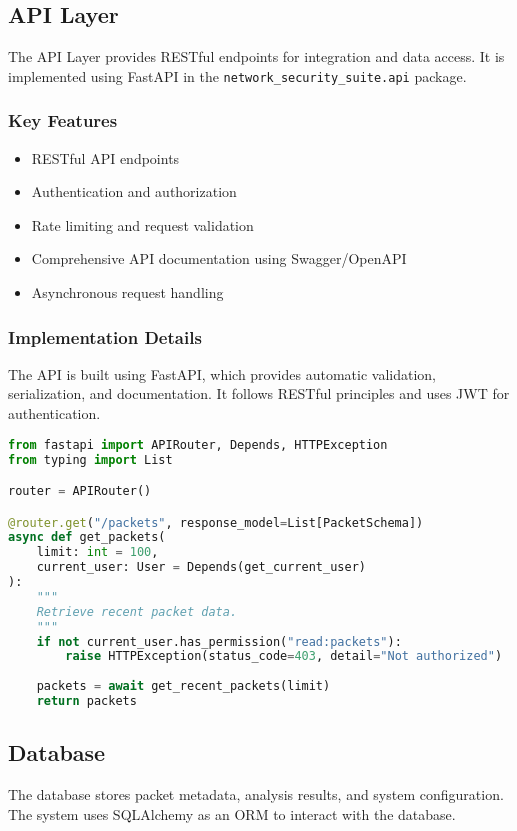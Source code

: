 \subsection{API Layer}
The API Layer provides RESTful endpoints for integration and data access. It is implemented using FastAPI in the \texttt{network\_security\_suite.api} package.

\subsubsection{Key Features}
\begin{itemize}
    \item RESTful API endpoints
    \item Authentication and authorization
    \item Rate limiting and request validation
    \item Comprehensive API documentation using Swagger/OpenAPI
    \item Asynchronous request handling
\end{itemize}

\subsubsection{Implementation Details}
The API is built using FastAPI, which provides automatic validation, serialization, and documentation. It follows RESTful principles and uses JWT for authentication.

\begin{lstlisting}[language=Python, caption=Example API Endpoint]
from fastapi import APIRouter, Depends, HTTPException
from typing import List

router = APIRouter()

@router.get("/packets", response_model=List[PacketSchema])
async def get_packets(
    limit: int = 100,
    current_user: User = Depends(get_current_user)
):
    """
    Retrieve recent packet data.
    """
    if not current_user.has_permission("read:packets"):
        raise HTTPException(status_code=403, detail="Not authorized")
    
    packets = await get_recent_packets(limit)
    return packets
\end{lstlisting}

\subsection{Database}
The database stores packet metadata, analysis results, and system configuration. The system uses SQLAlchemy as an ORM to interact with the database.

